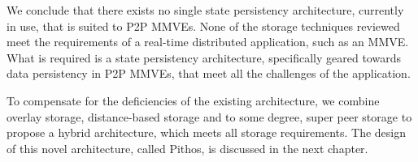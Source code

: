 We conclude that there exists no single state persistency architecture, currently in use, that is suited to P2P MMVEs. None of the storage techniques reviewed meet the requirements of a real-time distributed application, such as an MMVE. What is required is a state persistency architecture, specifically geared towards data persistency in P2P MMVEs, that meet all the challenges of the application.

To compensate for the deficiencies of the existing architecture, we combine overlay storage, distance-based storage and to some degree, super peer storage to propose a hybrid architecture, which meets all storage requirements. The design of this novel architecture, called Pithos, is discussed in the next chapter.